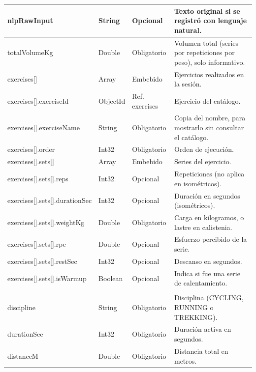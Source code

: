 {\begin{longtable}{|>{\raggedright\arraybackslash}p{4.7cm}|>{\raggedright\arraybackslash}p{1.8cm}|>{\raggedright\arraybackslash}p{2.3cm}|>{\raggedright\arraybackslash}p{5.4cm}|}
    nlpRawInput & String & Opcional & Texto original si se registró con lenguaje natural. \\ \hline
    totalVolumeKg & Double & Obligatorio & Volumen total (series por repeticiones por peso), solo informativo. \\ \hline
    exercises[]\allowbreak  & Array & Embebido & Ejercicios realizados en la sesión. \\ \hline
    exercises[]\allowbreak .\allowbreak exerciseId & ObjectId & Ref. exercises & Ejercicio del catálogo. \\ \hline
    exercises[]\allowbreak .\allowbreak exerciseName & String & Obligatorio & Copia del nombre, para mostrarlo sin consultar el catálogo. \\ \hline
    exercises[]\allowbreak .\allowbreak order & Int32 & Obligatorio & Orden de ejecución. \\ \hline
    exercises[]\allowbreak .\allowbreak sets[]\allowbreak  & Array & Embebido & Series del ejercicio. \\ \hline
    exercises[]\allowbreak .\allowbreak sets[]\allowbreak .\allowbreak reps & Int32 & Opcional & Repeticiones (no aplica en isométricos). \\ \hline
    exercises[]\allowbreak .\allowbreak sets[]\allowbreak .\allowbreak durationSec & Int32 & Opcional & Duración en segundos (isométricos). \\ \hline
    exercises[]\allowbreak .\allowbreak sets[]\allowbreak .\allowbreak weightKg & Double & Obligatorio & Carga en kilogramos, o lastre en calistenia. \\ \hline
    exercises[]\allowbreak .\allowbreak sets[]\allowbreak .\allowbreak rpe & Double & Opcional & Esfuerzo percibido de la serie. \\ \hline
    exercises[]\allowbreak .\allowbreak sets[]\allowbreak .\allowbreak restSec & Int32 & Opcional & Descanso en segundos. \\ \hline
    exercises[]\allowbreak .\allowbreak sets[]\allowbreak .\allowbreak isWarmup & Boolean & Opcional & Indica si fue una serie de calentamiento. \\ \hline
    \multicolumn{4}{|l|}{\cellcolor[HTML]{E3F2FD}\textbf{Solo cuando type = CARDIO}} \\ \hline
    discipline & String & Obligatorio & Disciplina (CYCLING, RUNNING o TREKKING). \\ \hline
    durationSec & Int32 & Obligatorio & Duración activa en segundos. \\ \hline
    distanceM & Double & Obligatorio & Distancia total en metros. \\ \hline

\end{longtable}}
